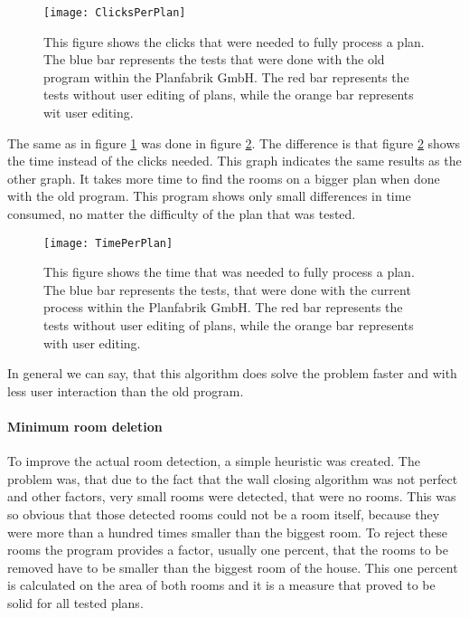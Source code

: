 \begin{figure}[H]
	\centering
	\texttt{[image: ClicksPerPlan]}
	\caption{This figure shows the clicks that were needed to fully process a plan. The blue bar represents the tests that were done with the old program within the Planfabrik GmbH. The red bar represents the tests without user editing of plans, while the orange bar represents wit user editing.}
	\label{fig:ClicksPerPlan}
\end{figure}

The same as in figure \ref{fig:ClicksPerPlan} was done in figure \ref{fig:TimePerPlan}. The difference is that figure \ref{fig:TimePerPlan} shows the time instead of the clicks needed. This graph indicates the same results as the other graph. It takes more time to find the rooms on a bigger plan when done with the old program. This program shows only small differences in time consumed, no matter the difficulty of the plan that was tested. 

\begin{figure}[H]
	\centering
	\texttt{[image: TimePerPlan]}
	\caption{This figure shows the time that was needed to fully process a plan. The blue bar represents the tests, that were done with the current process within the Planfabrik GmbH. The red bar represents the tests without user editing of plans, while the orange bar represents with user editing.}
	\label{fig:TimePerPlan}
\end{figure}

In general we can say, that this algorithm does solve the problem faster and with less user interaction than the old program.

\paragraph{Minimum room deletion}
\label{sub:MinimumRoom}
To improve the actual room detection, a simple heuristic was created. The problem was, that due to the fact that the wall closing algorithm was not perfect and other factors, very small rooms were detected, that were no rooms. This was so obvious that those detected rooms could not be a room itself, because they were more than a hundred times smaller than the biggest room.
To reject these rooms the program provides a factor, usually one percent, that the rooms to be removed have to be smaller than the biggest room of the house. This one percent is calculated on the area of both rooms and it is a measure that proved to be solid for all tested plans.


